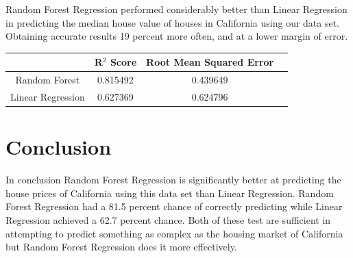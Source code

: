 \documentclass{article}
\begin{document}
Random Forest Regression performed considerably better than Linear Regression in predicting the median house value of houses in California using our data set. Obtaining accurate results 19 percent more often, and at a lower margin of error.

\begin{tabular}{ |c|c|c|c| } 
\hline
 & R$^2$ Score & Root Mean Squared Error \\
\hline
Random Forest & 0.815492 & 0.439649 \\ 
\hline
Linear Regression & 0.627369 & 0.624796 \\ 
\hline
\end{tabular}

\section{Conclusion}

In conclusion Random Forest Regression is significantly better at predicting the house prices of California using this data set than Linear Regression. Random Forest Regression had a 81.5 percent chance of correctly predicting while Linear Regression achieved a 62.7 percent chance. Both of these test are sufficient in attempting to predict something as complex as the housing market of California but Random Forest Regression does it more effectively.


\end{document}
